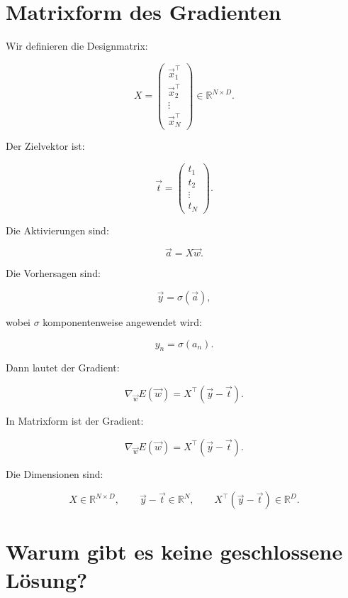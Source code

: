 \section{Matrixform des Gradienten}

Wir definieren die Designmatrix:

\[
    X
    =
    \begin{pmatrix}
        \vec{x}_1^{\top} \\
        \vec{x}_2^{\top} \\
        \vdots \\
        \vec{x}_N^{\top}
    \end{pmatrix}
    \in
    \mathbb{R}^{N\times D}.
\]

Der Zielvektor ist:

\[
    \vec{t}
    =
    \begin{pmatrix}
        t_1 \\
        t_2 \\
        \vdots \\
        t_N
    \end{pmatrix}.
\]

Die Aktivierungen sind:

\[
    \vec{a}
    =
    X\vec{w}.
\]

Die Vorhersagen sind:

\[
    \vec{y}
    =
    \sigma(\vec{a}),
\]

wobei \(\sigma\) komponentenweise angewendet wird:

\[
    y_n
    =
    \sigma(a_n).
\]

Dann lautet der Gradient:

\[
    \nabla_{\vec{w}}E(\vec{w})
    =
    X^{\top}(\vec{y}-\vec{t}).
\]

\begin{definitionbox}
In Matrixform ist der Gradient:

\[
    \nabla_{\vec{w}}E(\vec{w})
    =
    X^{\top}(\vec{y}-\vec{t}).
\]
\end{definitionbox}

\begin{notebox}
Die Dimensionen sind:

\[
    X \in \mathbb{R}^{N\times D},
    \qquad
    \vec{y}-\vec{t} \in \mathbb{R}^{N},
    \qquad
    X^{\top}(\vec{y}-\vec{t}) \in \mathbb{R}^{D}.
\]
\end{notebox}

\section{Warum gibt es keine geschlossene Lösung?}

